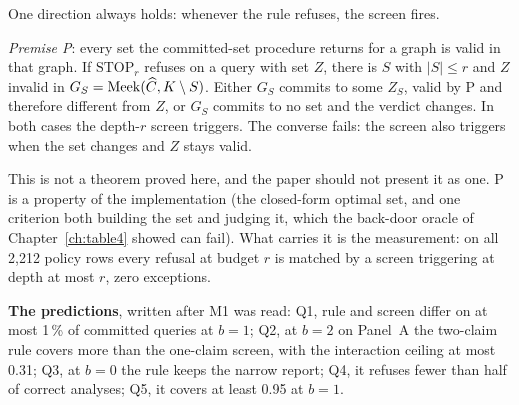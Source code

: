 One direction always holds: whenever the rule refuses, the screen fires.

\begin{formulabox}
\emph{Premise P}: every set the committed-set procedure returns for a graph is valid in that graph.
If $\mathrm{STOP}_r$ refuses on a query with set $Z$, there is $S$ with $|S| \le r$ and $Z$ invalid in
$G_S = \mathrm{Meek}(\widehat{C}, K \setminus S)$. Either $G_S$ commits to some $Z_S$, valid by P and
therefore different from $Z$, or $G_S$ commits to no set and the verdict changes. In both cases the
depth-$r$ screen triggers. The converse fails: the screen also triggers when the set changes and $Z$
stays valid.
\end{formulabox}

This is not a theorem proved here, and the paper should not present it as one. P is a property of
the implementation (the closed-form optimal set, and one criterion both building the set and judging
it, which the back-door oracle of Chapter~\ref{ch:table4} showed can fail). What carries it is the
measurement: on all 2,212 policy rows every refusal at budget $r$ is matched by a screen triggering at
depth at most $r$, zero exceptions.

\textbf{The predictions}, written after M1 was read: Q1, rule and screen differ on at most 1\,\% of
committed queries at $b = 1$; Q2, at $b = 2$ on Panel~A the two-claim rule covers more than the
one-claim screen, with the interaction ceiling at most 0.31; Q3, at $b = 0$ the rule keeps the narrow
report; Q4, it refuses fewer than half of correct analyses; Q5, it covers at least 0.95 at $b = 1$.


\begin{antes}
\end{antes}

